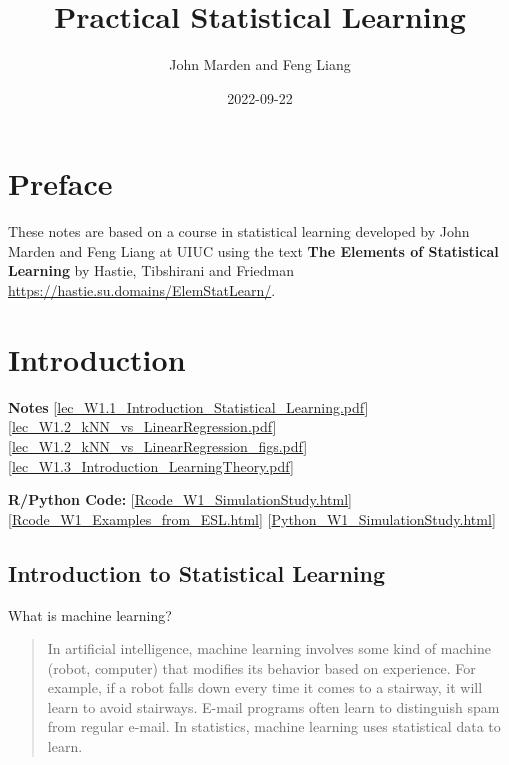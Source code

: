 \documentclass[
]{book}
\title{Practical Statistical Learning}
\author{John Marden and Feng Liang}
\date{2022-09-22}
\begin{document}
\maketitle

{
\setcounter{tocdepth}{1}
\tableofcontents
}
\hypertarget{preface}{%
\chapter*{Preface}\label{preface}}

These notes are based on a course in statistical learning developed by John Marden and Feng Liang at UIUC using the text \textbf{The Elements of Statistical Learning} by Hastie, Tibshirani and Friedman \url{https://hastie.su.domains/ElemStatLearn/}.

\hypertarget{intro}{%
\chapter{Introduction}\label{intro}}

\textbf{Notes}
{[}\href{https://liangfgithub.github.io/Notes/lec_W1.1_Introduction_Statistical_Learning.pdf}{lec\_W1.1\_Introduction\_Statistical\_Learning.pdf}{]}
{[}\href{https://liangfgithub.github.io/Notes/lec_W1.2_kNN_vs_LinearRegression.pdf}{lec\_W1.2\_kNN\_vs\_LinearRegression.pdf}{]}
{[}\href{https://liangfgithub.github.io/Notes/lec_W1.2_kNN_vs_LinearRegression_figs.pdf}{lec\_W1.2\_kNN\_vs\_LinearRegression\_figs.pdf}{]}
{[}\href{https://liangfgithub.github.io/Notes/lec_W1.3_Introduction_LearningTheory.pdf}{lec\_W1.3\_Introduction\_LearningTheory.pdf}{]}

\textbf{R/Python Code:}
{[}\href{https://liangfgithub.github.io/Rcode_W1_SimulationStudy.html}{Rcode\_W1\_SimulationStudy.html}{]}
{[}\href{https://liangfgithub.github.io/Rcode_W1_Examples_from_ESL.html}{Rcode\_W1\_Examples\_from\_ESL.html}{]}
{[}\href{https://liangfgithub.github.io/Python_W1_SimulationStudy.html}{Python\_W1\_SimulationStudy.html}{]}

\hypertarget{introduction-to-statistical-learning}{%
\section{Introduction to Statistical Learning}\label{introduction-to-statistical-learning}}

What is machine learning?

\begin{quote}
In artificial intelligence, machine learning involves some kind of
machine (robot, computer) that modifies its behavior based on experience. For example, if a robot falls down every time it comes to a stairway, it will learn to avoid stairways. E-mail programs often learn to distinguish spam from regular e-mail. In statistics, machine learning uses statistical data to learn.
\end{quote}
\end{document}
